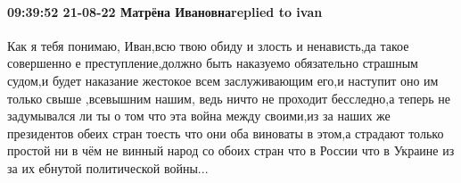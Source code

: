  
 
 
 
 

\paragraph{09:39:52 21-08-22 Матрёна Ивановнаreplied to ivan}

Как я тебя понимаю, Иван,всю твою обиду и злость и ненависть,да такое
совершенно е преступление,должно быть наказуемо обязательно страшным судом,и
будет наказание жестокое всем заслуживающим его,и наступит оно им только свыше
,всевышним нашим, ведь ничто не проходит бесследно,а теперь не задумывался ли
ты о том что эта война между своими,из за наших же президентов обеих стран
тоесть что они оба виноваты в этом,а страдают только простой ни в чём не винный
народ со обоих стран что в России что в Украине из за их ебнутой политической
войны...
